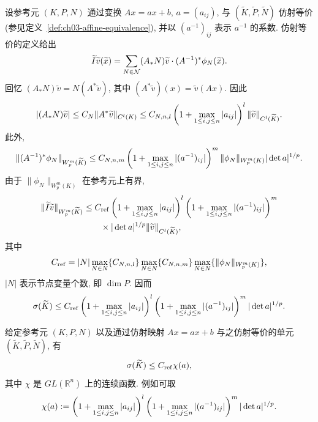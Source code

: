 设参考元 $(K,P,N)$ 通过变换 $Ax=ax+b$, $a=(a_{ij})$, 与 $(\widetilde K,\widetilde P,\widetilde N)$ 仿射等价(参见定义~\ref{def:ch03-affine-equivalence}), 并以 $(a^{-1})_{ij}$ 表示 $a^{-1}$ 的系数. 仿射等价的定义给出
\begin{equation}
\MathBookFormulaID{formula-ch04-affine-interpolant-representation}
\label{eq:ch04-affine-interpolant-representation}
\widetilde I\widetilde v(\widetilde x)
=\sum_{N\in\mathcal N}(A_*N)\widetilde v\cdot(A^{-1})^*\phi_N(\widetilde x).
\end{equation}
回忆 $(A_*N)\widetilde v=N(A^*\widetilde v)$, 其中 $(A^*\widetilde v)(x)=\widetilde v(Ax)$. 因此
\[
\MathBookFormulaID{formula-ch04-affine-node-functional-bound}
|(A_*N)\widetilde v|
\leq C_N\|A^*\widetilde v\|_{C^l(K)}
\leq C_{N,n,l}\left(1+\max_{1\leq i,j\leq n}|a_{ij}|\right)^l
\|\widetilde v\|_{C^l(\widetilde K)}.
\]
此外,
\[
\MathBookFormulaID{formula-ch04-affine-basis-function-bound}
\|(A^{-1})^*\phi_N\|_{W_p^m(\widetilde K)}
\leq C_{N,n,m}\left(1+\max_{1\leq i,j\leq n}|(a^{-1})_{ij}|\right)^m
\|\phi_N\|_{W_p^m(K)}|\det a|^{1/p}.
\]
由于 $\|\phi_N\|_{W_p^m(K)}$ 在参考元上有界,
\[
\MathBookFormulaID{formula-ch04-affine-interpolant-norm-bound}
\begin{aligned}
\|\widetilde I\widetilde v\|_{W_p^m(\widetilde K)}
&\leq C_{\mathrm{ref}}
\left(1+\max_{1\leq i,j\leq n}|a_{ij}|\right)^l
\left(1+\max_{1\leq i,j\leq n}|(a^{-1})_{ij}|\right)^m\\
&\qquad\times|\det a|^{1/p}\|\widetilde v\|_{C^l(\widetilde K)},
\end{aligned}
\]
其中
\[
\MathBookFormulaID{formula-ch04-reference-interpolation-constant}
C_{\mathrm{ref}}=|N|\max_{N\in N}\{C_{N,n,l}\}
\max_{N\in N}\{C_{N,n,m}\}\max_{N\in N}\{\|\phi_N\|_{W_p^m(K)}\},
\]
$|N|$ 表示节点变量个数, 即 $\dim P$. 因而
\begin{equation}
\MathBookFormulaID{formula-ch04-affine-sigma-bound}
\label{eq:ch04-affine-sigma-bound}
\sigma(\widetilde K)\leq C_{\mathrm{ref}}
\left(1+\max_{1\leq i,j\leq n}|a_{ij}|\right)^l
\left(1+\max_{1\leq i,j\leq n}|(a^{-1})_{ij}|\right)^m|\det a|^{1/p}.
\end{equation}

\setcounter{thmcount}{10}
\begin{Proposition}
\label{prop:ch04-affine-sigma-continuous-bound}
给定参考元 $(K,P,N)$ 以及通过仿射映射 $Ax=ax+b$ 与之仿射等价的单元 $(\widetilde K,\widetilde P,\widetilde N)$, 有
\begin{equation}
\MathBookFormulaID{formula-ch04-affine-sigma-continuous-bound}
\label{eq:ch04-affine-sigma-continuous-bound}
\sigma(\widetilde K)\leq C_{\mathrm{ref}}\chi(a),
\end{equation}
其中 $\chi$ 是 $GL(\mathbb R^n)$ 上的连续函数. 例如可取
\[
\MathBookFormulaID{formula-ch04-affine-chi-example}
\chi(a):=\left(1+\max_{1\leq i,j\leq n}|a_{ij}|\right)^l
\left(1+\max_{1\leq i,j\leq n}|(a^{-1})_{ij}|\right)^m|\det a|^{1/p}.
\]
\end{Proposition}

